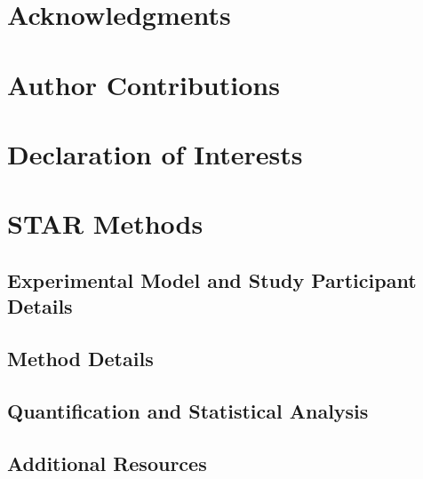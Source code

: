 \documentclass{article}
\begin{document}
\section{Acknowledgments}

\section{Author Contributions}

\section*{Declaration of Interests}



\section{STAR Methods}


\subsection{Experimental Model and Study Participant Details}


\subsection{Method Details}

\subsection{Quantification and Statistical Analysis}


\subsection{Additional Resources}
\end{document}
